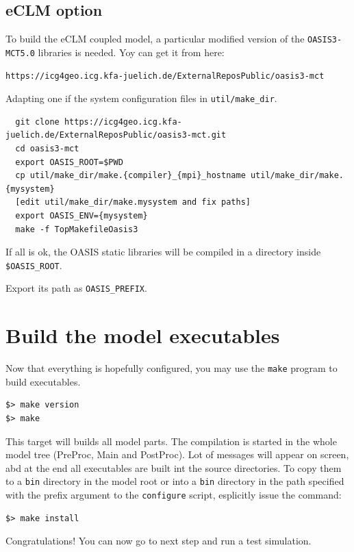 \subsection{eCLM option}

To build the eCLM coupled model, a particular modified version of the
\verb=OASIS3-MCT5.0= libraries is needed. Yoy can get it from here:

\begin{verbatim}
https://icg4geo.icg.kfa-juelich.de/ExternalReposPublic/oasis3-mct
\end{verbatim}

Adapting one if the system configuration files in \verb=util/make_dir=.

\begin{verbatim}
  git clone https://icg4geo.icg.kfa-juelich.de/ExternalReposPublic/oasis3-mct.git
  cd oasis3-mct
  export OASIS_ROOT=$PWD
  cp util/make_dir/make.{compiler}_{mpi}_hostname util/make_dir/make.{mysystem}
  [edit util/make_dir/make.mysystem and fix paths]
  export OASIS_ENV={mysystem}
  make -f TopMakefileOasis3
\end{verbatim}

If all is ok, the OASIS static libraries will be compiled in a directory
inside \verb=$OASIS_ROOT=.

Export its path as \verb=OASIS_PREFIX=.

\section{Build the model executables}

Now that everything is hopefully configured, you may use the \verb=make=
program to build executables.

\begin{Verbatim}
$> make version
$> make
\end{Verbatim}

This target will builds all model parts. 
The compilation is started in the whole model tree (PreProc, Main and PostProc).
Lot of messages will appear on screen, abd at the end all executables are built
int the source directories.
To copy them to a \verb=bin= directory in the model root or into a \verb=bin=
directory in the path specified with the prefix argument to the \verb=configure=
script, esplicitly issue the command:

\begin{Verbatim}
$> make install
\end{Verbatim}

Congratulations! You can now go to next step and run a test simulation.
